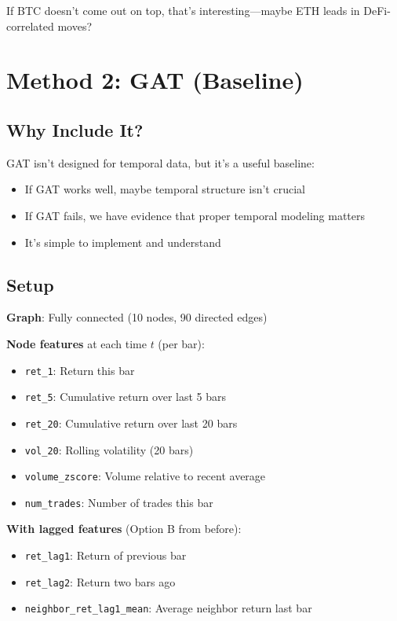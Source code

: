 \documentclass[11pt, a4paper]{article}
\begin{document}
If BTC doesn't come out on top, that's interesting---maybe ETH leads in DeFi-correlated moves?

\section{Method 2: GAT (Baseline)}

\subsection{Why Include It?}

GAT isn't designed for temporal data, but it's a useful baseline:
\begin{itemize}
    \item If GAT works well, maybe temporal structure isn't crucial
    \item If GAT fails, we have evidence that proper temporal modeling matters
    \item It's simple to implement and understand
\end{itemize}

\subsection{Setup}

\textbf{Graph}: Fully connected (10 nodes, 90 directed edges)

\textbf{Node features} at each time $t$ (per bar):
\begin{itemize}
    \item \texttt{ret\_1}: Return this bar
    \item \texttt{ret\_5}: Cumulative return over last 5 bars
    \item \texttt{ret\_20}: Cumulative return over last 20 bars
    \item \texttt{vol\_20}: Rolling volatility (20 bars)
    \item \texttt{volume\_zscore}: Volume relative to recent average
    \item \texttt{num\_trades}: Number of trades this bar
\end{itemize}

\textbf{With lagged features} (Option B from before):
\begin{itemize}
    \item \texttt{ret\_lag1}: Return of previous bar
    \item \texttt{ret\_lag2}: Return two bars ago
    \item \texttt{neighbor\_ret\_lag1\_mean}: Average neighbor return last bar
\end{itemize}
\end{document}
